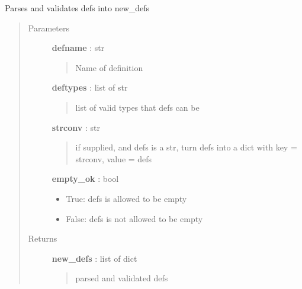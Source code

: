 \documentclass[letterpaper,10pt,english]{sphinxmanual}
\begin{document}
\begin{fulllineitems}
\label{pytan.utils:pytan.utils.parse_defs}
Parses and validates defs into new\_defs
\begin{quote}\begin{description}
\item[{Parameters}] \leavevmode
\textbf{defname} : str
\begin{quote}

Name of definition
\end{quote}

\textbf{deftypes} : list of str
\begin{quote}

list of valid types that defs can be
\end{quote}

\textbf{strconv} : str
\begin{quote}

if supplied, and defs is a str, turn defs into a dict with key = strconv, value = defs
\end{quote}

\textbf{empty\_ok} : bool
\begin{itemize}
\item {} 
True: defs is allowed to be empty

\item {} 
False: defs is not allowed to be empty

\end{itemize}

\item[{Returns}] \leavevmode
\textbf{new\_defs} : list of dict
\begin{quote}

parsed and validated defs
\end{quote}

\end{description}\end{quote}

\end{fulllineitems}

\end{document}

